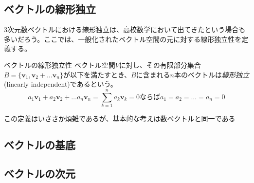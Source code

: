 \subsection{ベクトルの線形独立}
3次元数ベクトルにおける線形独立は、高校数学において出てきたという場合も多いだろう。ここでは、一般化されたベクトル空間の元に対する線形独立性を定義する。
\begin{definition*}{ベクトルの線形独立性}
	ベクトル空間\(V\)に対し、その有限部分集合\(B=\{\boldsymbol{v}_1,\boldsymbol{v}_2+\dots\boldsymbol{v}_n\}\)が以下を満たすとき、\(B\)に含まれる\(n\)本のベクトルは\emph{線形独立}(linearly independent)であるという。
	\begin{equation}
		a_1\boldsymbol{v}_1+a_2\boldsymbol{v}_2+\dots a_n\boldsymbol{v}_n = \sum_{k=1}^n {a_k\boldsymbol{v}_k} =0 ならば a_1=a_2=\dots=a_n=0
	\end{equation}
\end{definition*}
この定義はいささか煩雑であるが、基本的な考えは数ベクトルと同一である
\subsection{ベクトルの基底}

\subsection{ベクトルの次元}

